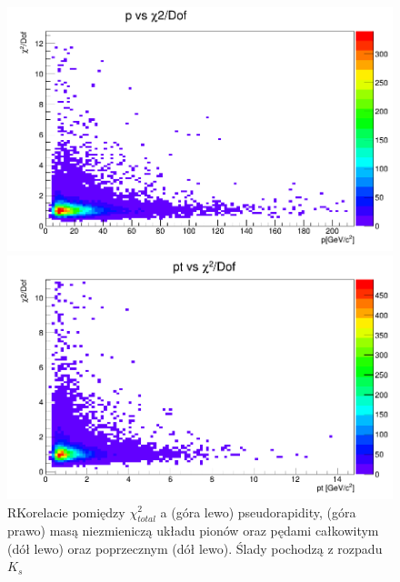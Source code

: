 \begin{figure}[H]
\vspace*{0.5cm} %
\begin{minipage}[t]{0.5\textwidth}
\includegraphics[width=\linewidth]{rozdzial6/JPsi_p_chi2.png}
\end{minipage}
\hspace{\fill}
\begin{minipage}[t]{0.5\textwidth}
\includegraphics[width=\linewidth]{rozdzial6/JPsi_pt_chi2.png}
\end{minipage}
\caption{RKorelacie pomiędzy $\chi^2_{total}$  a (góra lewo) pseudorapidity, (góra prawo) masą niezmieniczą układu pionów oraz pędami całkowitym (dół lewo) oraz poprzecznym (dół lewo). Ślady pochodzą z rozpadu $K_s$ } \label{corr_chi2JPsi}
\end{figure}

